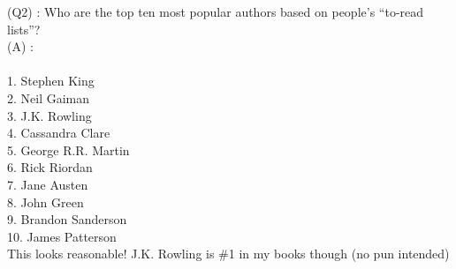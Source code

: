 \documentclass[11pt]{article}
\begin{document}
(Q2) : Who are the top ten most popular authors based on people's ``to-read lists''?\\

(A) :\\~\\
1. Stephen King\\
2. Neil Gaiman\\
3. J.K. Rowling\\
4. Cassandra Clare\\
5. George R.R. Martin\\
6. Rick Riordan\\
7. Jane Austen\\
8. John Green\\
9. Brandon Sanderson\\
10. James Patterson\\

This looks reasonable! J.K. Rowling is \#1 in my books though (no pun intended)
\end{document}
